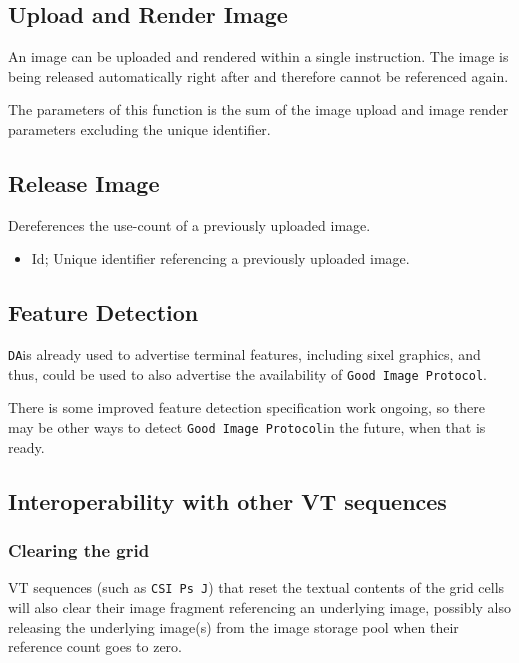 \documentclass{article}
\newcommand{\code}[1]{\colorbox{light-gray}{\texttt{#1}}}
\newcommand{\DA}{\code{DA}}
\newcommand{\GoodImageProtocol}{\code{Good Image Protocol}}
\begin{document}
\subsection{Upload and Render Image}

An image can be uploaded and rendered within a single instruction.
The image is being released automatically right after and therefore cannot be referenced
again.

The parameters of this function is the sum of the image upload and image render parameters excluding the unique
identifier.

\subsection{Release Image}

Dereferences the use-count of a previously uploaded image.

\begin{itemize}
    \item Id; Unique identifier referencing a previously uploaded image.
\end{itemize}

\subsection{Feature Detection}

\DA is already used to advertise terminal features, including sixel graphics, and thus,
could be used to also advertise the availability of \GoodImageProtocol.

There is some improved feature detection specification work ongoing,
so there may be other ways to detect \GoodImageProtocol in the future, when that is ready.

\subsection{Interoperability with other VT sequences}

\subsubsection*{Clearing the grid}

VT sequences (such as \code{CSI Ps J}) that reset the textual contents of the grid cells will also
clear their image fragment referencing an underlying image, possibly also releasing the
underlying image(s) from the image storage pool when their reference count goes to zero.
\end{document}
